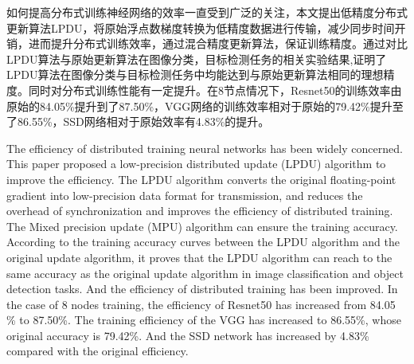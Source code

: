 \begin{cabstract}

如何提高分布式训练神经网络的效率一直受到广泛的关注，本文提出低精度分布式更新算法LPDU，将原始浮点数梯度转换为低精度数据进行传输，减少同步时间开销，进而提升分布式训练效率，通过混合精度更新算法，保证训练精度。通过对比LPDU算法与原始更新算法在图像分类，目标检测任务的相关实验结果,证明了LPDU算法在图像分类与目标检测任务中均能达到与原始更新算法相同的理想精度。同时对分布式训练性能有一定提升。在8节点情况下，Resnet50的训练效率由原始的84.05\%提升到了87.50\%，VGG网络的训练效率相对于原始的79.42\%提升至了86.55\%，SSD网络相对于原始效率有4.83\%的提升。

\end{cabstract}

\begin{eabstract}

The efficiency of distributed training neural networks has been widely concerned. This paper proposed a low-precision distributed update (LPDU) algorithm to improve the efficiency. The LPDU algorithm converts the original floating-point gradient into low-precision data format for transmission, and reduces the overhead of synchronization and improves the efficiency of distributed training. The Mixed precision update (MPU) algorithm can ensure the training accuracy. According to the training accuracy curves between the LPDU algorithm and the original update algorithm, it proves that the LPDU algorithm can reach to the same accuracy as the original update algorithm in image classification and object detection tasks. And the efficiency of distributed training has been improved. In the case of 8 nodes training, the efficiency of Resnet50 has increased from 84.05 \% to 87.50\%. The training efficiency of the VGG has increased to 86.55\%, whose original accuracy is 79.42\%. And the SSD network has increased by 4.83\% compared with the original efficiency.

\end{eabstract}

